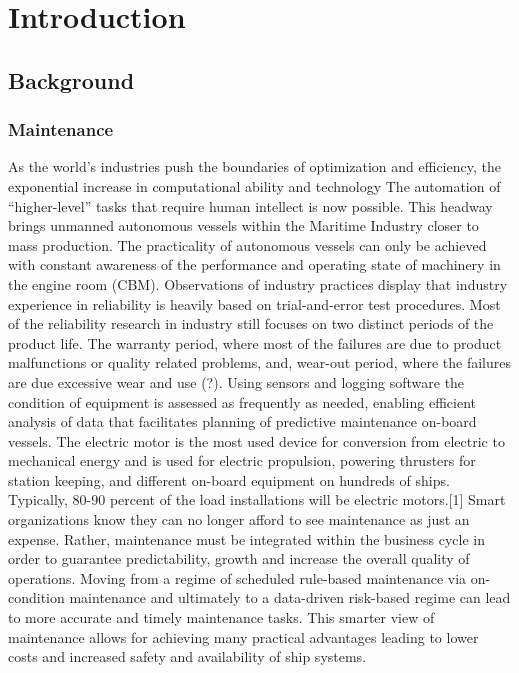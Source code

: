 \section{Introduction}
\label{sec:introduction}
\subsection{Background}
\subsubsection{Maintenance}
As the world’s industries push the boundaries of optimization and efficiency, the exponential increase in computational ability and technology The automation of “higher-level” tasks that require human intellect is now possible. This headway brings unmanned autonomous vessels within the Maritime Industry closer to mass production. The practicality of autonomous vessels can only be achieved with constant awareness of the performance and operating state of machinery in the engine room (CBM). Observations of industry practices display that industry experience in reliability is heavily based on trial-and-error test procedures. Most of the reliability research in industry still focuses on two distinct periods of the product life. The warranty period, where most of the failures are due to product malfunctions or quality related problems, and, wear-out period, where the failures are due excessive wear and use (?). Using sensors and logging software the condition of equipment is assessed as frequently as needed, enabling efficient analysis of data that facilitates planning of predictive maintenance on-board vessels. The electric motor is the most used device for conversion from electric to mechanical energy and is used for electric propulsion, powering thrusters for station keeping, and different on-board equipment on hundreds of ships. Typically, 80-90 percent of the load installations will be electric motors.[1] Smart organizations know they can no longer afford to see maintenance as just an expense. Rather, maintenance must be integrated within the business cycle in order to guarantee predictability, growth and increase the overall quality of operations. Moving from a regime of scheduled rule-based maintenance via on-condition maintenance and ultimately to a data-driven risk-based regime can lead to more accurate and timely maintenance tasks. This smarter view of maintenance allows for achieving many practical advantages leading to lower costs and increased safety and availability of ship systems. 



